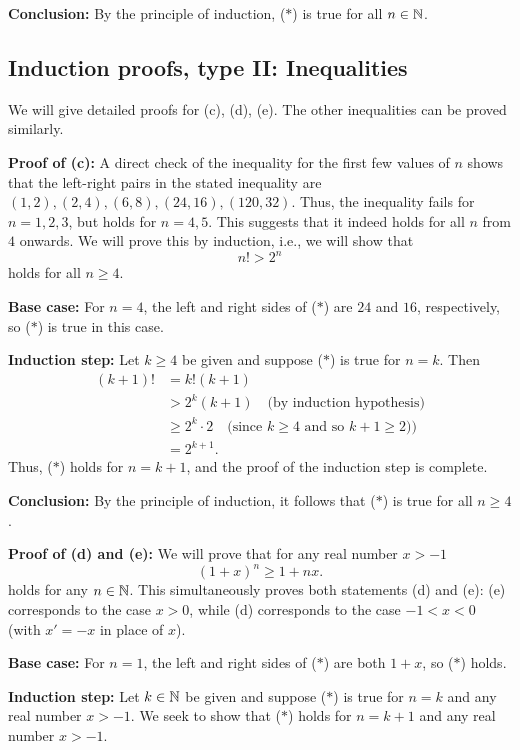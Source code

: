 \textbf{Conclusion:} By the principle of induction, 
($*$) is true for all $n\in\mathbb{N}$.  

\subsection{Induction proofs, type II: Inequalities}

We will give detailed proofs for (c), (d), (e). The other inequalities can
be proved similarly.

\medskip

\textbf{Proof of (c):}
A direct check of the inequality for the first few values of $n$ shows
that the left-right pairs in the stated inequality 
are $(1,2),(2,4),(6,8),(24,16),(120,32)$. Thus, the inequality
fails for $n=1,2,3$, but holds for $n=4,5$. This suggests that it indeed
holds for all $n$ from $4$ onwards. We will prove this by induction,
i.e., we will show that 
\[
n!>2^n
\tag{$*$}
\]
holds for all $n\ge4$.

\textbf{Base case:} For $n=4$, the left and right sides of ($*$) are 
$24$ and $16$, respectively, so ($*$) is true in this case. 

\textbf{Induction step:} Let $k\ge4$ be given and suppose 
($*$) is true for $n=k$. Then
\begin{align*}
(k+1)!&=k!(k+1)
\\
&>2^k(k+1)
\quad \text{(by induction hypothesis)}
\\
&\ge 2^k\cdot 2
\quad \text{(since $k\ge4$ and so $k+1\ge2$))}
\\
&=2^{k+1}.
\end{align*}
Thus, ($*$) holds for $n=k+1$, and the proof of the induction step is complete. 

\textbf{Conclusion:} By the principle of induction, 
it follows that ($*$) is true for all $n\ge4$.  

\bigskip

\textbf{Proof of (d) and (e):}
We will prove that for any real number $x>-1$  
\[
(1+x)^n\ge 1+nx.
\tag{$*$}
\]
holds for any $n\in\mathbb{N}$.
This simultaneously proves both statements (d) and (e): (e) corresponds
to the case $x>0$, while (d) corresponds to the case $-1<x<0$ (with
$x'=-x$ in place of $x$).

\textbf{Base case:} For $n=1$, the left and right sides of ($*$) are 
both $1+x$, so ($*$) holds.

\textbf{Induction step:} Let $k\in\mathbb{N}$ be given and suppose ($*$) is true
for $n=k$ and any real number $x>-1$.   We seek to show that ($*$) holds
for $n=k+1$ and any real number $x>-1$.


